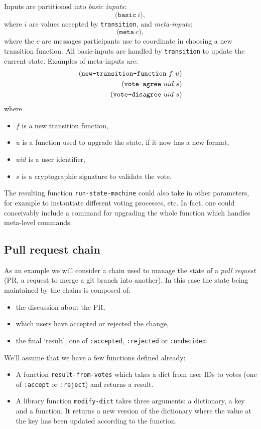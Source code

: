 Inputs are partitioned into \emph{basic inputs}:
\[
\mathtt{(basic} \ i),
\]
where $i$ are values accepted by \texttt{transition}, and \emph{meta-inputs}:
\[
\mathtt{(meta} \ c),
\]
where the $c$ are messages participants use to coordinate in choosing a new
transition function. All basic-inputs are handled by \texttt{transition}
to update the current state. Examples of meta-inputs are:
\begin{align*}
  (\text{\texttt{new-transition-function}} \ f \ u)\\
  (\text{\texttt{vote-agree}} \ uid \ s)\\
  (\text{\texttt{vote-disagree}} \ uid \ s)
\end{align*}
where
\begin{itemize}
\item $f$ is a new transition function,
\item $u$ is a function used to upgrade the state, if it now has a new format,
\item $uid$ is a user identifier,
\item $s$ is a cryptographic signature to validate the vote.
\end{itemize}
The resulting function \texttt{run-state-machine} could also take in other
parameters, for example to instantiate different voting processes, etc. In fact,
one could conceivably include a command for upgrading the whole function which
handles meta-level commands.

\subsection{Pull request chain}

As an example we will consider a chain used to manage the state of
a \emph{pull request} (PR, a request to merge a git branch into another). In this
case the state being maintained by the chains is composed of:
\begin{itemize}
  \item the discussion about the PR,
  \item which users have accepted or rejected the change,
  \item the final `result', one of \texttt{:accepted}, \texttt{:rejected} or
    \texttt{:undecided}.
\end{itemize}

We'll assume that we have a few functions defined already:
\begin{itemize}
  \item A function \texttt{result-from-votes} which takes a dict from user IDs
    to votes (one of \texttt{:accept} or \texttt{:reject}) and returns a result.
  \item A library function \texttt{modify-dict} takes three arguments: a
    dictionary, a key and a function. It returns a new version of the dictionary
    where the value at the key has been updated according to the function.
\end{itemize}

